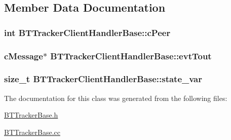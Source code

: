 \subsection{Member Data Documentation}
\hypertarget{classBTTrackerClientHandlerBase_ae06f0ce4f1021ec9cc94f8900dac50b5}{}
\subsubsection[{c\+Peer}]{\setlength{\rightskip}{0pt plus 5cm}int B\+T\+Tracker\+Client\+Handler\+Base\+::c\+Peer\hspace{0.3cm}{\ttfamily [protected]}}\label{classBTTrackerClientHandlerBase_ae06f0ce4f1021ec9cc94f8900dac50b5}
\hypertarget{classBTTrackerClientHandlerBase_a8291f72257d451243e30b1a0b77ed1e6}{}
\subsubsection[{evt\+Tout}]{\setlength{\rightskip}{0pt plus 5cm}c\+Message$\ast$ B\+T\+Tracker\+Client\+Handler\+Base\+::evt\+Tout\hspace{0.3cm}{\ttfamily [protected]}}\label{classBTTrackerClientHandlerBase_a8291f72257d451243e30b1a0b77ed1e6}
\hypertarget{classBTTrackerClientHandlerBase_a1f5c8ad3f3fddc535e349468eb3ac526}{}
\subsubsection[{state\+\_\+var}]{\setlength{\rightskip}{0pt plus 5cm}size\+\_\+t B\+T\+Tracker\+Client\+Handler\+Base\+::state\+\_\+var\hspace{0.3cm}{\ttfamily [protected]}}\label{classBTTrackerClientHandlerBase_a1f5c8ad3f3fddc535e349468eb3ac526}


The documentation for this class was generated from the following files\+:\begin{DoxyCompactItemize}
\item 
\hyperlink{BTTrackerBase_8h}{B\+T\+Tracker\+Base.\+h}\item 
\hyperlink{BTTrackerBase_8cc}{B\+T\+Tracker\+Base.\+cc}\end{DoxyCompactItemize}
